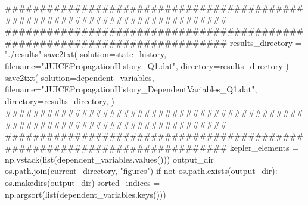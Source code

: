 {}###########################################################################\markdownRendererInterblockSeparator
{}
\markdownRendererSectionEnd \markdownRendererSectionBegin
{}\markdownRendererInterblockSeparator
{}########################################################################### results_directory = "./results" save2txt( solution=state_history, filename="JUICEPropagationHistory_Q1.dat", directory=results_directory ) save2txt( solution=dependent_variables, filename="JUICEPropagationHistory_DependentVariables_Q1.dat", directory=results_directory, )\markdownRendererInterblockSeparator
{}###########################################################################\markdownRendererInterblockSeparator
{}
\markdownRendererSectionEnd \markdownRendererSectionBegin
{}\markdownRendererInterblockSeparator
{}###########################################################################\markdownRendererInterblockSeparator
{}
\markdownRendererSectionEnd \markdownRendererSectionBegin
{}\markdownRendererInterblockSeparator
{}kepler_elements = np.vstack(list(dependent_variables.values()))\markdownRendererInterblockSeparator
{}
\markdownRendererSectionEnd \markdownRendererSectionBegin
{}\markdownRendererInterblockSeparator
{}
\markdownRendererSectionEnd \markdownRendererSectionBegin
{}\markdownRendererInterblockSeparator
{}output_dir = os.path.join(current_directory, "figures") if not os.path.exists(output_dir): os.makedirs(output_dir)\markdownRendererInterblockSeparator
{}
\markdownRendererSectionEnd \markdownRendererSectionBegin
{}\markdownRendererInterblockSeparator
{}
\markdownRendererSectionEnd \markdownRendererSectionBegin
{}\markdownRendererInterblockSeparator
{}sorted_indices = np.argsort(list(dependent_variables.keys()))\markdownRendererInterblockSeparator
{}
\markdownRendererSectionEnd \markdownRendererSectionBegin
{}\markdownRendererInterblockSeparator
{}
\markdownRendererSectionEnd \markdownRendererSectionBegin
{}\markdownRendererInterblockSeparator
